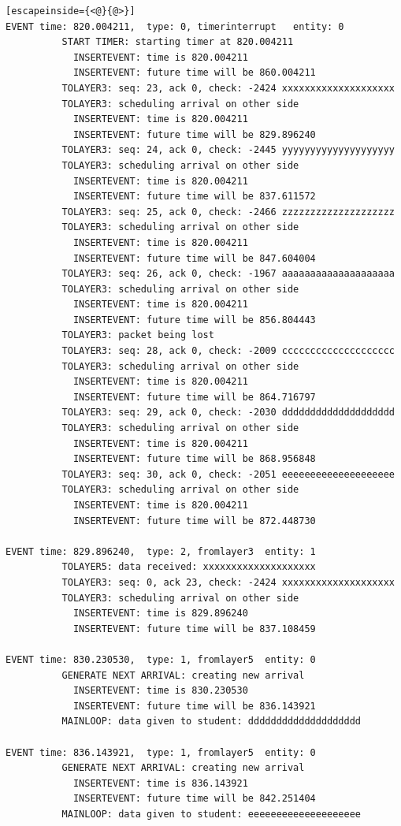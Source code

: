 \documentclass[paper=a4, fontsize=11pt]{scrartcl}
\numberwithin{equation}{section}		%
\numberwithin{figure}{section}			%
\numberwithin{table}{section}				%
\begin{document}
\begin{lstlisting}[escapeinside={<@}{@>}]
EVENT time: 820.004211,  type: 0, timerinterrupt   entity: 0
          START TIMER: starting timer at 820.004211
            INSERTEVENT: time is 820.004211
            INSERTEVENT: future time will be 860.004211
          TOLAYER3: seq: 23, ack 0, check: -2424 xxxxxxxxxxxxxxxxxxxx
          TOLAYER3: scheduling arrival on other side
            INSERTEVENT: time is 820.004211
            INSERTEVENT: future time will be 829.896240
          TOLAYER3: seq: 24, ack 0, check: -2445 yyyyyyyyyyyyyyyyyyyy
          TOLAYER3: scheduling arrival on other side
            INSERTEVENT: time is 820.004211
            INSERTEVENT: future time will be 837.611572
          TOLAYER3: seq: 25, ack 0, check: -2466 zzzzzzzzzzzzzzzzzzzz
          TOLAYER3: scheduling arrival on other side
            INSERTEVENT: time is 820.004211
            INSERTEVENT: future time will be 847.604004
          TOLAYER3: seq: 26, ack 0, check: -1967 aaaaaaaaaaaaaaaaaaaa
          TOLAYER3: scheduling arrival on other side
            INSERTEVENT: time is 820.004211
            INSERTEVENT: future time will be 856.804443
          TOLAYER3: packet being lost
          TOLAYER3: seq: 28, ack 0, check: -2009 cccccccccccccccccccc
          TOLAYER3: scheduling arrival on other side
            INSERTEVENT: time is 820.004211
            INSERTEVENT: future time will be 864.716797
          TOLAYER3: seq: 29, ack 0, check: -2030 dddddddddddddddddddd
          TOLAYER3: scheduling arrival on other side
            INSERTEVENT: time is 820.004211
            INSERTEVENT: future time will be 868.956848
          TOLAYER3: seq: 30, ack 0, check: -2051 eeeeeeeeeeeeeeeeeeee
          TOLAYER3: scheduling arrival on other side
            INSERTEVENT: time is 820.004211
            INSERTEVENT: future time will be 872.448730

EVENT time: 829.896240,  type: 2, fromlayer3  entity: 1
          TOLAYER5: data received: xxxxxxxxxxxxxxxxxxxx
          TOLAYER3: seq: 0, ack 23, check: -2424 xxxxxxxxxxxxxxxxxxxx
          TOLAYER3: scheduling arrival on other side
            INSERTEVENT: time is 829.896240
            INSERTEVENT: future time will be 837.108459

EVENT time: 830.230530,  type: 1, fromlayer5  entity: 0
          GENERATE NEXT ARRIVAL: creating new arrival
            INSERTEVENT: time is 830.230530
            INSERTEVENT: future time will be 836.143921
          MAINLOOP: data given to student: dddddddddddddddddddd

EVENT time: 836.143921,  type: 1, fromlayer5  entity: 0
          GENERATE NEXT ARRIVAL: creating new arrival
            INSERTEVENT: time is 836.143921
            INSERTEVENT: future time will be 842.251404
          MAINLOOP: data given to student: eeeeeeeeeeeeeeeeeeee


\end{lstlisting}
\end{document}
